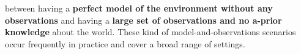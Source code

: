 




between having a {\bf perfect model of the environment without any observations} and having a {\bf large set of observations and no a-prior knowledge} about the world. These kind of model-and-observations scenarios occur frequently in practice and cover a broad range of settings. %
























